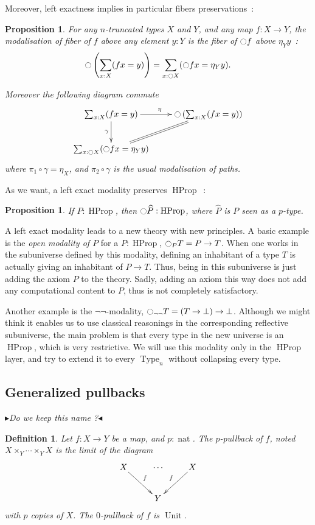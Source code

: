 \documentclass[conference]{IEEEtran}
\newtheorem{prop}[thm]{Proposition}
\newtheorem{defi}[thm]{Definition}
\newcommand{\mynote}[2]{
    \fbox{\bfseries\sffamily\scriptsize#1}
    {\small$\blacktriangleright$\textsf{\emph{#2}}$\blacktriangleleft$}~}
\newcommand\kq[1]{\mynote{KQ}{#1}}
\DeclareMathOperator{\Type}{Type}
\DeclareMathOperator{\HProp}{HProp}
\DeclareMathOperator{\nat}{nat}
\DeclareMathOperator{\Unit}{Unit}
\newcommand{\modal}{\ensuremath{\ocircle}}
\begin{document}
Moreover, left exactness implies in particular fibers preservations~:
\begin{prop}
For any $n$-truncated types $X$ and $Y$,
and any map $f:X \to Y$, the modalisation of fiber of $f$ above any element $y:Y$
is the fiber of $\modal f$ above $\eta_Y y$~:
$$\modal \left(\sum_{x:X}  (f x = y)\right) = \sum_{x:\modal X} (\modal f x = \eta_Y y).$$

Moreover the following diagram commute
$$\xymatrix{
  \sum_{x:X} (f x = y) \ar[r]^\eta \ar[d]_\gamma & \modal \left(\sum_{x:X}  (f x = y)\right) \ar@{=}[dl]\\
  \sum_{x:\modal X} (\modal f x = \eta_Y y) &
}$$
where $\pi_1 \circ \gamma = \eta_X$, and $\pi_2 \circ \gamma$ is the
usual modalisation of paths.
\end{prop}


As we want, a left exact modality preserves $\HProp$~:
\begin{prop}
  If $P:\HProp$, then $\modal \widehat P : \HProp$, where $\widehat P$
  is $P$ seen as a $p$-type.
\end{prop}

A left exact modality leads to a new theory with new principles. A
basic example is the {\em open modality of $P$} for a $P:\HProp$, $\modal_P T = P \to T$. 
When one works in the subuniverse defined by this modality, defining
an inhabitant of a type $T$ is actually giving an inhabitant of $P \to
T$. Thus, being in this subuniverse is just adding the axiom $P$ to
the theory. Sadly, adding an axiom this way does not add any
computational content to $P$, thus is not completely satisfactory.

Another example is the $\lnot\lnot$-modality, $\modal_{\lnot\lnot} T = (T
\to \bot) \to \bot$. Although we might think it enables us to use
classical reasonings in the corresponding reflective subuniverse, the
main problem is that every type in the new universe is an $\HProp$,
which is very restrictive. 
We will use this modality only in the $\HProp$ layer, and try to
extend it to every $\Type_n$ without collapsing every type.

\subsection{Generalized pullbacks}
\label{sec:gener-pb}
\kq{Do we keep this name ?}

\begin{defi}
  Let $f:X \to Y$ be a map, and $p:\nat$. The $p$-pullback of $f$,
  noted $X\times_Y \cdots\times_Y X$ is
  the limit of the diagram
  $$\xymatrix{
    X \ar[rd]^f & \cdots & X \ar[ld]_f \\
      &    Y   &
  }$$
  with $p$ copies of $X$. The $0$-pullback of $f$ is $\Unit$.
\end{defi}
\end{document}
